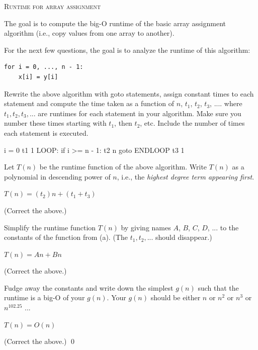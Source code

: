 

\LATEXHELPTHREEFIVEZERO

\TURNPAGE

\newpage
\textsc{Runtime for array assignment}

The goal is to compute the big-O runtime of the basic array
assignment algorithm (i.e., copy values from one array to another).

For the next few questions,
the goal is to analyze the runtime of this algorithm:
\begin{Verbatim}[frame=single]
for i = 0, ..., n - 1:
    x[i] = y[i]
\end{Verbatim}

\nextq
Rewrite the above algorithm with
goto statements, assign constant times to each statement and
compute the time taken as a function of $n$, $t_1$, $t_2$, $t_3$, ....
where $t_1, t_2, t_3, ...$ are runtimes for each statement in your
algorithm. Make sure you
number these times starting with $t_1$, then
$t_2$, etc.
Include the number of times each statement is executed.
\\
\ANSWER
\begin{answercode}
          i = 0                   t1      1
LOOP:     if i >= n - 1:          t2      n
              goto ENDLOOP        t3      1
\end{answercode}

\nextq
Let $T(n)$ be the runtime function of the above algorithm.
Write $T(n)$ as a polynomial in descending power of $n$, i.e.,
the \textit{highest degree term appearing first}.
\\
\ANSWER
\begin{answerlong}
$T(n) = (t_{2})n + (t_{1} + t_{3})$
\end{answerlong}
(Correct the above.)

\nextq
Simplify the runtime function $T(n)$
by giving names $A$, $B$, $C$, $D$, ...
to the constants of the function from (a). (The $t_1, t_2, ...$ should
disappear.)
\\
\ANSWER
\begin{answerlong}
$T(n) = A n + B n$
\end{answerlong}
(Correct the above.)

\nextq
Fudge away the constants and write down the simplest $g(n)$ such
that the runtime is a big-O of your $g(n)$.
Your $g(n)$ should be either $n$ or $n^2$ or $n^3$ or $n^{102.25}$ ...
\\
\ANSWER
\begin{answerlong}
$T(n) = O(n)$
\end{answerlong}
(Correct the above.)
\qed


